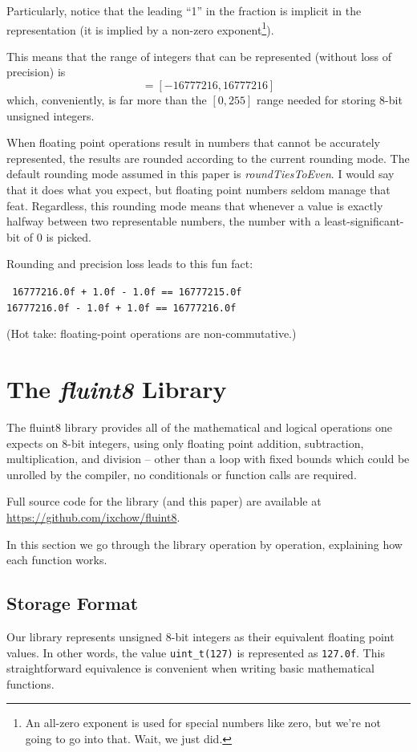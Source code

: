 \documentclass{acmsiggraph}
\theoremstyle{remark}
\theoremstyle{definition}
\begin{document}
Particularly, notice that the leading ``1'' in the fraction is implicit in the representation (it is implied by a non-zero exponent\footnote{An all-zero exponent is used for special numbers like zero, but we're not going to go into that. Wait, we just did.}).

This means that the range of integers that can be represented (without loss of precision) is
\begin{displaymath}
[-2^{24},2^{24}] = [-16777216, 16777216]
\end{displaymath}
which, conveniently, is far more than the $[0,255]$ range needed for storing 8-bit unsigned integers.

When floating point operations result in numbers that cannot be accurately represented, the results are rounded according to the current rounding mode.
The default rounding mode assumed in this paper is {\em roundTiesToEven}.
I would say that it does what you expect, but floating point numbers seldom manage that feat.
Regardless, this rounding mode means that whenever a value is exactly halfway between two representable numbers, the number with a least-significant-bit of 0 is picked.

Rounding and precision loss leads to this fun fact:
\begin{center} \tt
16777216.0f + 1.0f - 1.0f == 16777215.0f\\
16777216.0f - 1.0f + 1.0f == 16777216.0f
\end{center}
(Hot take: floating-point operations are non-commutative.)

\section{The {\em fluint8} Library}
The fluint8 library provides all of the mathematical and logical operations one expects on 8-bit integers, using only floating point addition, subtraction, multiplication, and division --
other than a loop with fixed bounds which could be unrolled by the compiler, no conditionals or function calls are required.

Full source code for the library (and this paper) are available at \url{https://github.com/ixchow/fluint8}.

In this section we go through the library operation by operation, explaining how each function works.

\subsection{Storage Format}
Our library represents unsigned 8-bit integers as their equivalent floating point values.
In other words, the value {\tt uint\_t(127)} is represented as {\tt 127.0f}.
This straightforward equivalence is convenient when writing basic mathematical functions.
\end{document}
